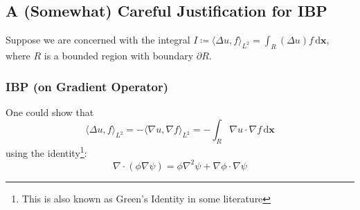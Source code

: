 \documentclass[a4paper]{article}
\newcommand{\dxx}{\, \text{d} \mathbf{x}}
\theoremstyle{definition}
\begin{document}
\subsection{A (Somewhat) Careful Justification for IBP}
\label{sct: IBP Justification}
Suppose we are concerned with the integral $I \coloneqq \langle \Delta u, f \rangle_{L^2} = \int_{R} (\Delta u)f \dxx$, where $R$ is a bounded region with boundary $\partial R$.

%
%

\subsubsection{IBP (on Gradient Operator)}
One could show that 
\begin{equation}
    \langle \Delta u, f \rangle_{L^2} = - \langle \nabla u, \nabla f \rangle_{L^2} = - \int_{R} \nabla u \cdot \nabla f \dxx
    \label{equ: IBP Gradient}
\end{equation}
using the identity\footnote{This is also known as Green's Identity in some literature}:
\begin{equation}
\nabla \cdot \left( \phi \nabla \psi \right) = \phi \nabla^2 \psi + \nabla \phi \cdot \nabla \psi
    \label{equ: Green's Identity II}
\end{equation}
\end{document}
